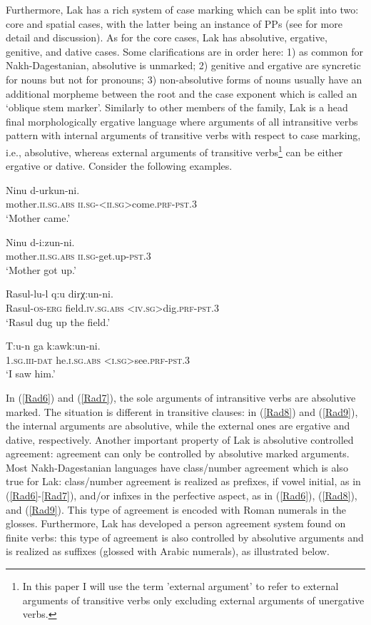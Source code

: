 \documentclass[output=paper]{langscibook}
\begin{document}
Furthermore, Lak has a rich system of case marking which can be split into two: core and spatial cases, with the latter being an instance of PPs (see \citet{Radkevich2010} for more detail and discussion). As for the core cases, Lak has absolutive, ergative, genitive, and dative cases. Some clarifications are in order here: 1) as common for Nakh-Dagestanian, absolutive is unmarked; 2) genitive and ergative are syncretic for nouns but not for pronouns; 3) non-absolutive forms of nouns usually have an additional morpheme between the root and the case exponent which is called an ‘oblique stem marker’.
Similarly to other members of the family, Lak is a head final morphologically ergative language where arguments of all intransitive verbs pattern with internal arguments of transitive verbs with respect to case marking, i.e., absolutive, whereas external arguments of transitive verbs\footnote{In this paper I will use the term 'external argument' to refer to external arguments of transitive verbs only excluding external arguments of unergative verbs.} can be either ergative or dative. Consider the following examples.

\ea\label{Rad6}
\gll Ninu d-urkun-ni.\\
mother.\textsc{ii.sg.abs} \textsc{ii.sg}-\textsc{<ii.sg>}come.\textsc{prf}-\textsc{pst.3}\\
\glt ‘Mother came.’
\z

\ea\label{Rad7}
\gll Ninu d-i:zun-ni.\\
mother.\textsc{ii.sg.abs} \textsc{ii.sg}-get.up-\textsc{pst.3}\\
\glt ‘Mother got up.’
\z

\ea\label{Rad8}
\gll Rasul-lu-l q:u dirχ:un-ni.\\
Rasul-\textsc{os-erg} field.\textsc{iv.sg.abs} \textsc{<iv.sg>}dig.\textsc{prf-pst.3}\\
\glt ‘Rasul dug up the field.’
\z

\ea\label{Rad9}
\gll T:u-n ga k:awk:un-ni.\\ 
\textsc{1.sg.iii-dat} he.\textsc{i.sg.abs} \textsc{<i.sg>}see.\textsc{prf-pst.3}\\
\glt ‘I saw him.’
\z

In (\ref{Rad6}) and (\ref{Rad7}), the sole arguments of intransitive verbs are absolutive marked. 
The situation is different in transitive clauses: 
in (\ref{Rad8}) and (\ref{Rad9}), the internal arguments are absolutive, while the external ones are ergative and dative, respectively. 
Another important property of Lak is absolutive controlled agreement: agreement can only be controlled by absolutive marked arguments. 
Most Nakh-Dagestanian languages have class/number agreement which is also true for Lak: 
class/number agreement is realized as prefixes, if vowel initial, as in (\ref{Rad6}-\ref{Rad7}), 
and/or infixes in the perfective aspect, as in (\ref{Rad6}), (\ref{Rad8}), and (\ref{Rad9}). 
This type of agreement is encoded with Roman numerals in the glosses. 
Furthermore, Lak has developed a person agreement system found on finite verbs: 
this type of agreement is also controlled by absolutive arguments and is realized as suffixes (glossed with Arabic numerals), as illustrated below.
\end{document}
